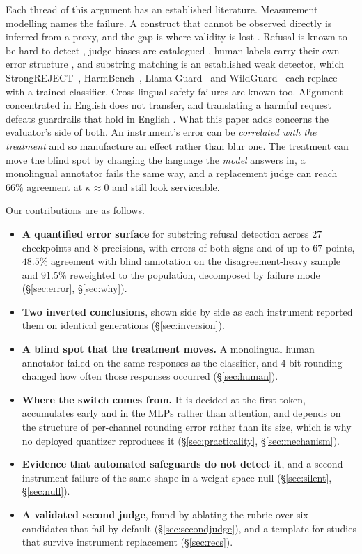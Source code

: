 \documentclass[conference,compsoc,letterpaper]{IEEEtran}
\begin{document}
Each thread of this argument has an established literature. Measurement modelling names the failure. A construct that cannot be observed directly is inferred from a proxy, and the gap is where validity is lost \cite{cronbach1955,jacobs2021measurement}. Refusal is known to be hard to detect \cite{rottger2024xstest}, judge biases are catalogued \cite{zheng2023judge}, human labels carry their own error structure \cite{aroyo2015crowdtruth,plank2022variation}, and substring matching is an established weak detector, which StrongREJECT~\cite{souly2024strongreject}, HarmBench~\cite{harmbench2024}, Llama Guard~\cite{inan2023llamaguard} and WildGuard~\cite{han2024wildguard} each replace with a trained classifier. Cross-lingual safety failures are known too. Alignment concentrated in English does not transfer, and translating a harmful request defeats guardrails that hold in English \cite{yong2023lowresource,deng2024multilingual}. What this paper adds concerns the evaluator's side of both. An instrument's error can be \emph{correlated with the treatment} and so manufacture an effect rather than blur one. The treatment can move the blind spot by changing the language the \emph{model} answers in, a monolingual annotator fails the same way, and a replacement judge can reach $66\%$ agreement at $\kappa \approx 0$ and still look serviceable.

Our contributions are as follows.

\begin{itemize}
\item \textbf{A quantified error surface} for substring refusal detection
      across $27$ checkpoints and $8$ precisions, with errors of both signs and of up to $67$ points, $48.5\%$ agreement with blind annotation on the disagreement-heavy
      sample and $91.5\%$ reweighted to the population, decomposed by failure
      mode (\S\ref{sec:error}, \S\ref{sec:why}).
\item \textbf{Two inverted conclusions}, shown side by side as each instrument
      reported them on identical generations (\S\ref{sec:inversion}).
\item \textbf{A blind spot that the treatment moves.} A monolingual human
      annotator failed on the same responses as the classifier, and 4-bit
      rounding changed how often those responses occurred (\S\ref{sec:human}).
\item \textbf{Where the switch comes from.} It is decided at the first token,
      accumulates early and in the MLPs rather than attention, and depends on
      the structure of per-channel rounding error rather than its size, which is why no deployed
      quantizer reproduces it (\S\ref{sec:practicality},
      \S\ref{sec:mechanism}).
\item \textbf{Evidence that automated safeguards do not detect it}, and a
      second instrument failure of the same shape in a weight-space null
      (\S\ref{sec:silent}, \S\ref{sec:null}).
\item \textbf{A validated second judge}, found by ablating the rubric over six
      candidates that fail by default (\S\ref{sec:secondjudge}), and a
      template for studies that survive instrument replacement
      (\S\ref{sec:recs}).
\end{itemize}
\end{document}
